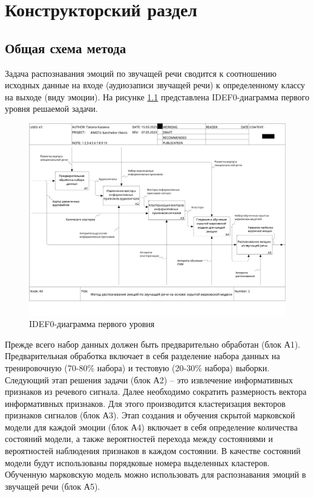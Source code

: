 \chapter{Конструкторский раздел}
\section{Общая схема метода}
Задача распознавания эмоций по звучащей речи сводится к соотношению исходных данные на входе (аудиозаписи звучащей речи) к определенному классу на выходе (виду эмоции). На рисунке \ref{fig:idef1} представлена IDEF0-диаграмма первого уровня решаемой задачи.
\begin{figure}[H]
	\centering
	\includegraphics[width=\linewidth]{assets/02_A0}
	\caption{IDEF0-диаграмма первого уровня}
	\label{fig:idef1}
\end{figure}
Прежде всего набор данных должен быть предварительно обработан (блок А1).  Предварительная обработка включает в себя разделение набора данных на тренировочную (70-80\% набора) и тестовую (20-30\% набора) выборки.
Следующий этап решения задачи (блок А2) -- это извлечение информативных признаков из речевого сигнала.  Далее необходимо сократить размерность вектора информативных признаков. Для этого производится кластеризация векторов признаков сигналов (блок А3).  Этап создания и обучения скрытой марковской модели для каждой эмоции (блок А4) включает в себя определение количества состояний модели, а также вероятностей перехода между состояниями и вероятностей наблюдения признаков в каждом состоянии. В качестве состояний модели будут использованы порядковые номера выделенных кластеров. Обученную марковскую модель можно использовать для распознавания эмоций в звучащей речи (блок А5).
